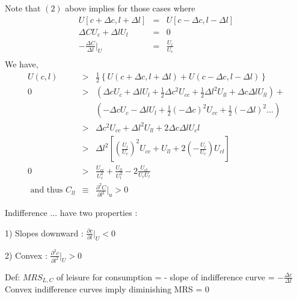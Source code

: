 Note that $(2)$ above implies for those cases where 
\begin{eqnarray*}
U\left[c + \Delta c, l + \Delta l \right] &=& U \left[ c-\Delta c, l - \Delta l \right]\\
\Delta C U_c + \Delta l U_l &=& 0\\
-\frac{\Delta C}{\Delta l} \vert_U &=& \frac{U_l}{U_c}\\
\end{eqnarray*}
We have,
\begin{eqnarray}
U(c,l) &>& \frac{1}{2} \left\{ U(c+\Delta c, l+\Delta l) + U(c-\Delta c, l- \Delta l) \right\} \nonumber\\
0 &>& (\Delta c U_c + \Delta l U_l + \frac{1}{2} \Delta c^2 U_{cc} + \frac{1}{2} \Delta l^2 U_{ll} + \Delta c \Delta l U_{ll}) + \nonumber\\
&& (-\Delta c U_c - \Delta l U_l + \frac{1}{2} (-\Delta c)^2 U_{cc} + \frac{1}{2} (-\Delta l)^2 ...) \nonumber\\
&>& \Delta c^2 U_{cc} + \Delta l^2 U_{ll} + 2 \Delta c \Delta l U_cl\nonumber\\
&>& \Delta l^2 \left[ \left( \frac{U_l}{U_c}\right) ^2 U_{cc} + U_{ll} + 2 \left( -\frac{U_l}{U_c}\right) U_{cl}\right]\nonumber\\
0 &>& \frac{U_{cc}}{U_c^2} + \frac{U_{ll}}{U_l^2} - 2 \frac{U_{cl}}{U_c U_l}\\
\mbox{ and thus } C_{ll} &\equiv & \frac{\partial^2 C}{\partial l^2} \vert_u > 0
\end{eqnarray}

Indifference ... have two properties :
\begin{list}{ }{}
\item 1) Slopes downward : $ \frac{\partial c}{\partial l} \vert_U < 0 $
\item 2) Convex : $ \frac{\partial^2 c}{\partial l^2} \vert_U > 0 $
\end{list}
Def: $MRS_{L,C}$ of leisure for consumption = - slope of indifference curve = $- \frac{\Delta c}{\Delta l}$ \\
Convex indifference curves imply diminishing MRS = 0
